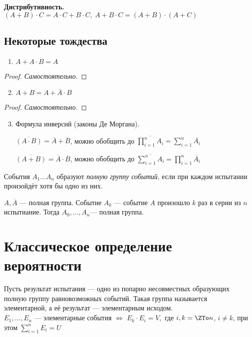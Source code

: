 \textbf{Дистрибутивность.} $(A + B)\cdot C = A\cdot C + B\cdot C, \;  A + B\cdot C = (A + B)\cdot (A + C)$

\subsection{Некоторые тождества}
\begin{enumerate}
	\item $A + A\cdot B = A$
\end{enumerate}
\begin{proof}
	\textit{Самостоятельно.}
\end{proof}

\begin{enumerate}
	\setcounter{enumi}{1}
	\item{$A + B = A + \bar{A}\cdot B$}
\end{enumerate}
\begin{proof}
	\textit{Самостоятельно.}
\end{proof}

\begin{enumerate}
	\setcounter{enumi}{2}
	\item Формула инверсий (законы Де Моргана).
	      \smallskip

	      $\overline{(A\cdot B)} = \overline{A} + \overline{B}$, можно обобщить до $\overline{\prod\limits_{i=1}^n A_i} = \sum\limits_{i=1}^n \overline{A_i} $

	      $\overline{(A + B)} = \overline{A}\cdot \overline{B}$, можно обобщить до $\overline{\sum\limits_{i=1}^n A_i} = \prod\limits_{i=1}^n \overline{A_i} $
\end{enumerate}
События $A_1 \dots A_n$ образуют \textit{полную группу событий}, если при каждом испытании произойдёт хотя бы одно из них.
\smallskip

\example $A, \overline{A}$ --- полная группа.
\example Событие $A_k$ --- событие $A$ произошло $k$ раз в серии из $n$ испытиание. Тогда $A_0, \ldots, A_n$--- полная группа.

\section{Классическое определение вероятности}
Пусть результат испытания --- одно из попарно несовместных образующих полную группу равновозможных событий. Такая группа называется элементарной, а её результат --- элементарным исходом. \\
$E_1, \dots, E_n$ --- элементарные события $\Leftrightarrow$ $E_k\cdot E_i = V,$ где $i, k = \ZTo n$, $i \not= k$, при этом $\sum\limits_{i = 1}^n E_i = U$

